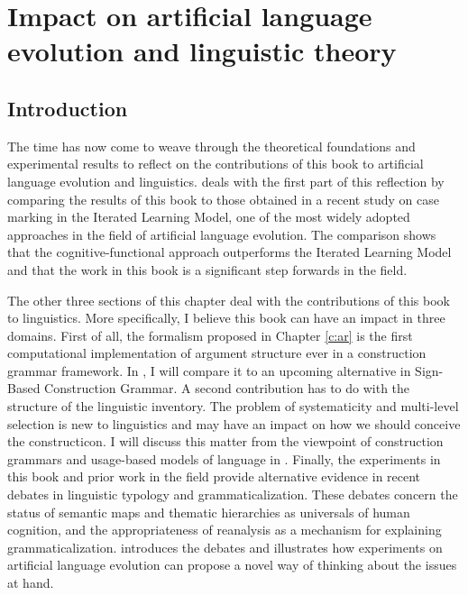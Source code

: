 
\setcounter{chapter}{4}
\chapter{Impact on artificial language evolution and linguistic theory}
\label{c:impact}
\label{c:impact-linguistics}


\section{Introduction}
The time has now come to weave through the theoretical foundations and experimental results to reflect on the contributions of this book to artificial language evolution and linguistics.  deals with the first part of this reflection by comparing the results of this book to those obtained in a recent study on case marking in the Iterated Learning Model, one of the most widely adopted approaches in the field of artificial language evolution. The comparison shows that the cognitive-functional approach outperforms the Iterated Learning Model and that the work in this book is a significant step forwards in the field.

The other three sections of this chapter deal with the contributions of this book to linguistics. More specifically, I believe this book can have an impact in three domains. First of all, the formalism proposed in Chapter \ref{c:ar} is the first computational implementation of argument structure ever in a construction grammar framework. In , I will compare it to an upcoming alternative in Sign-Based Construction Grammar. A second contribution has to do with the structure of the linguistic inventory. The problem of systematicity and multi-level selection is new to linguistics and may have an impact on how we should conceive the constructicon. I will discuss this matter from the viewpoint of construction grammars and usage-based models of language in . Finally, the experiments in this book and prior work in the field provide alternative evidence in recent debates in linguistic typology and grammaticalization. These debates concern the status of semantic maps and thematic hierarchies as universals of human cognition, and the appropriateness of reanalysis as a mechanism for explaining grammaticalization.  introduces the debates and illustrates how experiments on artificial language evolution can propose a novel way of thinking about the issues at hand.

